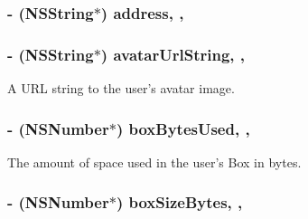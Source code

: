 \hypertarget{interface_m_b_user_a444397aa067cf65287a72615bdbdf076}{
\subsubsection[{address}]{\setlength{\rightskip}{0pt plus 5cm}-\/ (N\-S\-String$\ast$) address\hspace{0.3cm}{\ttfamily [read]}, {\ttfamily [nonatomic]}, {\ttfamily [strong]}}}\label{interface_m_b_user_a444397aa067cf65287a72615bdbdf076}
\hypertarget{interface_m_b_user_a561dafa784b88045a1660b62565aa4ed}{
\subsubsection[{avatar\-Url\-String}]{\setlength{\rightskip}{0pt plus 5cm}-\/ (N\-S\-String$\ast$) avatar\-Url\-String\hspace{0.3cm}{\ttfamily [read]}, {\ttfamily [nonatomic]}, {\ttfamily [strong]}}}\label{interface_m_b_user_a561dafa784b88045a1660b62565aa4ed}


A U\-R\-L string to the user's avatar image. 

\hypertarget{interface_m_b_user_acb7add7d0302f772a6129c0051613c31}{
\subsubsection[{box\-Bytes\-Used}]{\setlength{\rightskip}{0pt plus 5cm}-\/ (N\-S\-Number$\ast$) box\-Bytes\-Used\hspace{0.3cm}{\ttfamily [read]}, {\ttfamily [nonatomic]}, {\ttfamily [strong]}}}\label{interface_m_b_user_acb7add7d0302f772a6129c0051613c31}


The amount of space used in the user's Box in bytes. 

\hypertarget{interface_m_b_user_a5f0c26ade8cb0b15f1067b38c019ce7a}{
\subsubsection[{box\-Size\-Bytes}]{\setlength{\rightskip}{0pt plus 5cm}-\/ (N\-S\-Number$\ast$) box\-Size\-Bytes\hspace{0.3cm}{\ttfamily [read]}, {\ttfamily [nonatomic]}, {\ttfamily [strong]}}}\label{interface_m_b_user_a5f0c26ade8cb0b15f1067b38c019ce7a}


